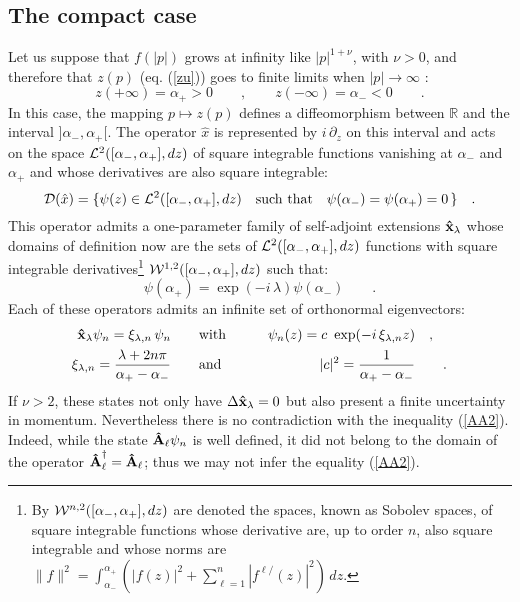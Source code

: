 \documentclass[a4paper,10pt]{article}
\newcommand{\x}{\mbox{\rm{\bf \^ x}}}
\newcommand{\A}{\mbox{\rm{\bf \^ A}}}
\newcommand{\Ad}{\bf \mbox{\rm{\A}}^\dagger}
\newcommand{\xl}{\x_{\lambda}}
\newcommand{\cD}{{\cal D}}
\newcommand{\cW}{{\cal W}}
\newcommand{\cL}{{\cal L}}
\newcommand{\RR}{\mathbb R}
\begin{document}
\subsection{The compact case}
Let us suppose that $f(|p|)$ grows at infinity like $|p|^{1+\nu}$,
with $\nu>0$, and therefore that $z(p)$ (eq. (\ref{zu})) goes to
finite limits when $|p|\rightarrow\infty$ :
\begin{equation} z(+\infty)=\alpha_+>0\qquad,\qquad
z(-\infty)=\alpha_-<0\qquad.\label{zfini}
\end{equation} In this case, the mapping $p\mapsto z(p)$ defines a
diffeomorphism between $\RR$ and the interval
$]\alpha_-,\alpha_+[$. The operator $\hat x$ is represented by
$i\,\partial_z$ on this interval and acts on the space
${\cL}^2([\alpha_-,\alpha_+],dz)$ of square integrable functions
vanishing at $\alpha_-$ and $\alpha_+$ and whose derivatives are
also square integrable:
\begin{equation}
\cD(\hat x)=\{\psi(z)\in {\cL}^2([\alpha_-,\alpha_+],dz)\quad{\rm
such\ that}\quad
\psi(\alpha_-)=\psi(\alpha_+)=0\,\}\label{domx}\quad.
\end{equation}
This operator admits a one-parameter family of self-adjoint
extensions \cite{RiNa} $\xl$ whose domains of definition now are
the sets of $\cL^2([\alpha_-,\alpha_+],dz)$ functions with square
integrable derivatives\footnote{By
$\cW^{n,2}([\alpha_-,\alpha_+],dz)$ are denoted the spaces, known
as Sobolev spaces, of square integrable functions whose derivative
are, up to order $n$, also square integrable and whose norms are
$\|f\|^2=\int_{\alpha_-}^{\alpha_+}(|f(z)|^2+\sum_{\ell=1}^n|f^{\ell/}(z)|^2)\,
dz$.} $\cW^{1,2}([\alpha_-,\alpha_+], dz)$ such that:
\begin{equation}
\psi(\alpha_+)=\exp(-i\,\lambda)\psi(\alpha_-)\qquad .
\end{equation} Each of these operators admits an infinite set of
orthonormal eigenvectors:
\begin{eqnarray}
\xl\psi_{n}=\xi_{\lambda,n}\,\psi_{n}&\qquad {\rm
with}\qquad&\psi_{n}(z)=c\
\exp(-i\,\xi_{\lambda,n} z)\quad,\quad\\
\xi_{\lambda,n}=\frac{\lambda+2n\pi}{\alpha_+ -\alpha_-}&\qquad
{\rm and}\qquad& |c|^2=\frac1{\alpha_+ -\alpha_-}\qquad .
\end{eqnarray} If $\nu>2$, these states not only have $\Delta\xl=0$
but also present a finite uncertainty in momentum. Nevertheless
there is no contradiction with the inequality (\ref{AA2}). Indeed,
while the state $\A_\ell\psi_{n}$ is well defined, it did not
belong to the domain of the operator $\Ad_\ell=\A_\ell$; thus we
may not infer the equality (\ref{AA2}).
\end{document}
